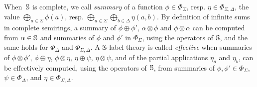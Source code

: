 %

\medskip\noindent
When~$\mathbb{S}$ is complete, 
we call \emph{summary} of a function
$\phi \in \Phi_\Sigma$,
resp. $\eta \in \Phi_{\Sigma, \Delta}$,
the value $\bigoplus_{a \in \Sigma} \phi(a)$, 
resp. $\bigoplus_{a \in \Sigma} \bigoplus_{b \in \Delta} \eta(a, b)$.
By definition of infinite sums in complete semirings, 
a summary of $\phi \oplus \phi'$, $\alpha \otimes \phi$ and $\phi \otimes \alpha$
can be computed from $\alpha \in \mathbb{S}$ and summaries of $\phi$ and $\phi'$ in $\Phi_{\Sigma}$, using the operators of $\mathbb{S}$, 
and the same holds for $\Phi_{\Delta}$ and $\Phi_{\Sigma, \Delta}$. 
%
A $\mathbb{S}$-label theory is called \emph{effective} when 
summaries of $\phi \otimes \phi'$, 
$\phi \oplus \eta$, $\phi \otimes \eta$, $\eta \oplus \psi$, $\eta \otimes \psi$, 
and of the partial applications $\eta_a$ and $\eta_b$, 
can be effectively computed, using the operators of $\mathbb{S}$, 
from summaries of 
$\phi, \phi' \in \Phi_{\Sigma}$, $\psi \in \Phi_{\Delta}$, 
and $\eta \in \Phi_{\Sigma, \Delta}$. 

